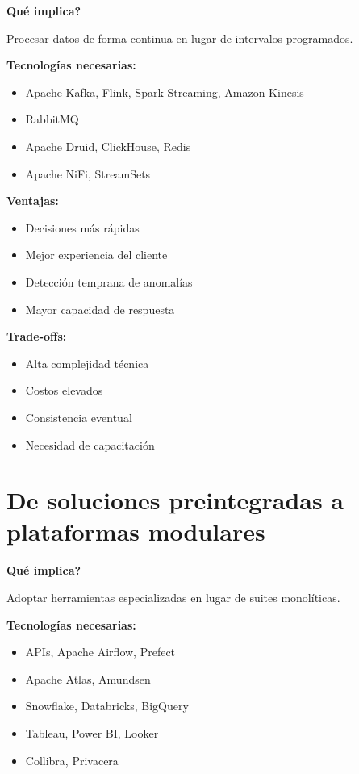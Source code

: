 \documentclass[12pt]{article}
\begin{document}
\textbf{\textquestiondown Qu\'e implica?} \par
Procesar datos de forma continua en lugar de intervalos programados.

\textbf{Tecnolog\'ias necesarias:}
\begin{itemize}
\item Apache Kafka, Flink, Spark Streaming, Amazon Kinesis
\item RabbitMQ
\item Apache Druid, ClickHouse, Redis
\item Apache NiFi, StreamSets
\end{itemize}

\textbf{Ventajas:}
\begin{itemize}
\item Decisiones m\'as r\'apidas
\item Mejor experiencia del cliente
\item Detecci\'on temprana de anomal\'ias
\item Mayor capacidad de respuesta
\end{itemize}

\textbf{Trade-offs:}
\begin{itemize}
\item Alta complejidad t\'ecnica
\item Costos elevados
\item Consistencia eventual
\item Necesidad de capacitaci\'on
\end{itemize}

\section{De soluciones preintegradas a plataformas modulares}

\textbf{\textquestiondown Qu\'e implica?} \par
Adoptar herramientas especializadas en lugar de suites monol\'iticas.

\textbf{Tecnolog\'ias necesarias:}
\begin{itemize}
\item APIs, Apache Airflow, Prefect
\item Apache Atlas, Amundsen
\item Snowflake, Databricks, BigQuery
\item Tableau, Power BI, Looker
\item Collibra, Privacera
\end{itemize}
\end{document}
